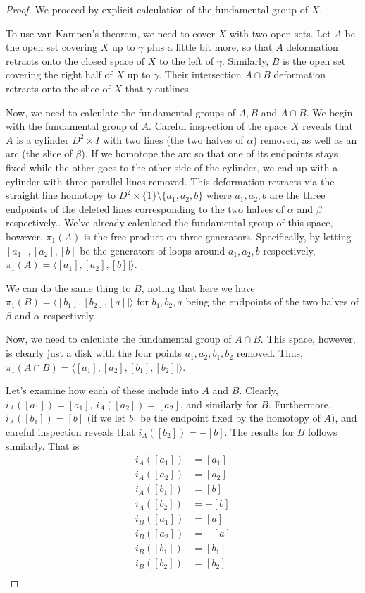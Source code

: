\documentclass[fontsize=11pt]{scrartcl} %
\numberwithin{equation}{section} %
\numberwithin{figure}{section} %
\numberwithin{table}{section} %
\begin{document}
\begin{proof}
    We proceed by explicit calculation of the fundamental group of $X$.
    
    To use van Kampen's theorem, we need to cover $X$ with two open sets. Let
    $A$ be the open set covering $X$ up to $\gamma$ plus a little bit more, so
    that $A$ deformation retracts onto the closed space of $X$ to the left of
    $\gamma$. Similarly, $B$ is the open set covering the right half of $X$ up
    to $\gamma$. Their intersection $A\cap B$ deformation retracts onto the
    slice of $X$ that $\gamma$ outlines.

    Now, we need to calculate the fundamental groups of $A,B$ and $A\cap B$. We
    begin with the fundamental group of $A$. Careful inspection of the space
    $X$ reveals that $A$ is a cylinder $D^2\times I$ with two lines (the two
    halves of $\alpha$) removed, as well as an arc (the slice of $\beta$). If we
    homotope the arc so that one of its endpoints stays fixed while the other
    goes to the other side of the cylinder, we end up with a cylinder with three
    parallel lines removed. This deformation retracts via the straight line
    homotopy to $D^2\times\{1\}\setminus\{a_1,a_2,b\}$ where $a_1,a_2,b$ are the three
    endpoints of the deleted lines corresponding to the two halves of $\alpha$
    and $\beta$ respectively.. We've already calculated the fundamental
    group of this space, however. $\pi_1(A)$ is the free product on
    three generators. Specifically, by letting $[a_1],[a_2],[b]$ be the generators
    of loops around $a_1,a_2,b$ respectively, $\pi_1(A) = \langle
    [a_1],[a_2],[b]|\rangle$.

    We can do the same thing to $B$, noting that here we have $\pi_1(B) =
    \langle [b_1],[b_2],[a]|\rangle$ for $b_1,b_2,a$ being the endpoints of the
    two halves of $\beta$ and $\alpha$ respectively.

    Now, we need to calculate the fundamental group of $A\cap B$. This space,
    however, is clearly just a disk with the four points $a_1,a_2,b_1,b_2$
    removed. Thus, $\pi_1(A\cap B) = \langle [a_1],[a_2],[b_1],[b_2]|\rangle$.

    Let's examine how each of these include into $A$ and $B$. Clearly,
    $i_A([a_1]) = [a_1]$, $i_A([a_2]) = [a_2]$, and similarly for $B$.
    Furthermore, $i_A([b_1]) = [b]$ (if we let $b_1$ be the endpoint fixed by
    the homotopy of $A$), and careful inspection reveals that $i_A([b_2]) =
    -[b]$. The results for $B$ follows similarly. That is
    \[
\begin{aligned}
    i_A([a_1]) &= [a_1]\\
    i_A([a_2]) &= [a_2]\\
    i_A([b_1]) &= [b]\\
    i_A([b_2]) &= -[b]\\
    i_B([a_1]) &= [a]\\
    i_B([a_2]) &= -[a]\\
    i_B([b_1]) &= [b_1]\\
    i_B([b_2]) &= [b_2]\\
\end{aligned}
    \]


\end{proof}
\end{document}
